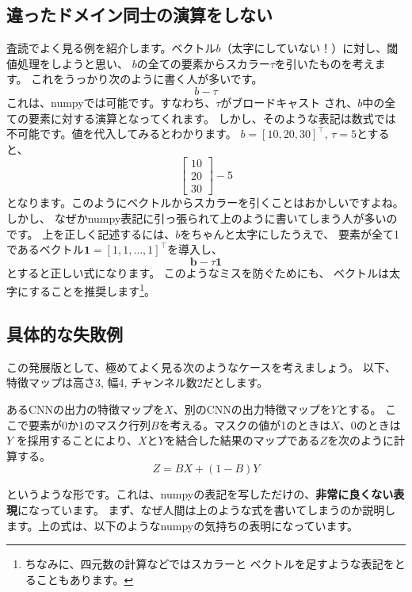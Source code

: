 \documentclass[uplatex,twocolumn,9pt,dvipdfmx]{jsarticle}
\begin{document}
\subsection{違ったドメイン同士の演算をしない}
査読でよく見る例を紹介します。ベクトル$b$（太字にしていない！）に対し、閾値処理をしようと思い、
$b$の全ての要素からスカラー$\tau$を引いたものを考えます。
これをうっかり次のように書く人が多いです。
\begin{equation}
b - \tau
\end{equation}
これは、numpyでは可能です。すなわち、$\tau$がブロードキャスト
され、$b$中の全ての要素に対する演算となってくれます。
しかし、そのような表記は数式では不可能です。値を代入してみるとわかります。
$b=[10, 20, 30]^\top$, $\tau=5$とすると、
\begin{equation}
    \begin{bmatrix}
        10 \\
        20 \\
        30
    \end{bmatrix} - 5
\end{equation}
となります。このようにベクトルからスカラーを引くことはおかしいですよね。しかし、
なぜかnumpy表記に引っ張られて上のように書いてしまう人が多いのです。
上を正しく記述するには、$b$をちゃんと太字にしたうえで、
要素が全て1であるベクトル$\mathbf{1} = [1, 1, \dots, 1]^\top$を導入し、
\begin{equation}
    \mathbf{b} - \tau\mathbf{1}
\end{equation}
とすると正しい式になります。
このようなミスを防ぐためにも、
ベクトルは太字にすることを推奨します\footnote{ちなみに、四元数の計算などではスカラーと
ベクトルを足すような表記をとることもあります。}。

\subsection{具体的な失敗例}
この発展版として、極めてよく見る次のようなケースを考えましょう。
以下、特徴マップは高さ3, 幅4, チャンネル数2だとします。
\begin{screen}
あるCNNの出力の特徴マップを$X$、別のCNNの出力特徴マップを$Y$とする。
ここで要素が0か1のマスク行列$B$を考える。マスクの値が1のときは$X$、0のときは$Y$
を採用することにより、$X$と$Y$を結合した結果のマップである$Z$を次のように計算する。
\begin{equation}
    Z = BX + (1-B)Y
\end{equation}
\end{screen}
というような形です。これは、numpyの表記を写しただけの、\textbf{非常に良くない表現}になっています。
まず、なぜ人間は上のような式を書いてしまうのか説明します。上の式は、以下のようなnumpyの気持ちの表明になっています。
\end{document}

